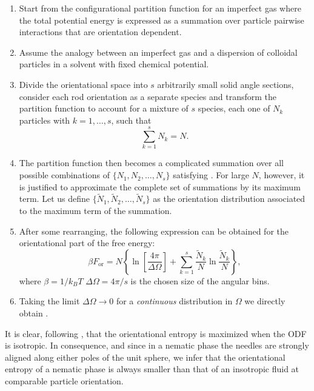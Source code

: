 \vspace{0.3cm}
\begin{enumerate}
\setlength\itemsep{1em}
\item Start from the configurational partition function for an imperfect gas where the total potential energy is expressed as a summation over particle pairwise interactions that are orientation dependent.
\item Assume the analogy between an imperfect gas and a dispersion of colloidal particles in a solvent with fixed chemical potential.
\item Divide the orientational space into $s$ arbitrarily small solid angle sections, consider each rod orientation as a separate species and transform the partition function to account for a mixture of $s$ species, each one of $N_k$ particles with $k = 1,\ldots,s$, such that
\begin{equation}
\sum _{k=1}^{s} N_{k} =N. \label{0behoud}
\end{equation}

\item The partition function then becomes a complicated summation over all possible combinations of $\{N_{1},N_{2}, \ldots, N_{s}\}$ satisfying . For large $N$, however, it is justified to approximate the complete set of summations by its maximum term. Let us define $\{\tilde{N}_{1},\tilde{N}_{2},\ldots,\tilde{N}_{s}\}$ as the orientation distribution associated to the maximum term of the summation.
\item After some rearranging, the following expression can be obtained for the orientational part of the free energy:
\begin{equation}
\beta F_{\text{or}}=N\left\{\ln \left[\frac{4\pi}{\Delta \Omega}\right] + \sum_{k=1}^{s}\frac{\tilde{N}_{k}}{N}\ln \frac{\tilde{N}_{k}}{N} \right\},
\label{0fordiscreet}
\end{equation}
where $\beta=1/k_BT$ $\Delta \Omega = 4\pi/s$ is the chosen size of the angular bins.

\item Taking the limit $\Delta \Omega \rightarrow 0$ for a {\em continuous} distribution in $\Omega$ we directly obtain .
\end{enumerate}
\vspace{0.3cm}

It is clear, following , that the orientational entropy is maximized when the ODF is isotropic. In consequence, and since in a nematic phase the needles are strongly aligned along either poles of the unit sphere, we infer that the orientational entropy of a nematic phase is always smaller than that of an insotropic fluid at comparable particle orientation.

